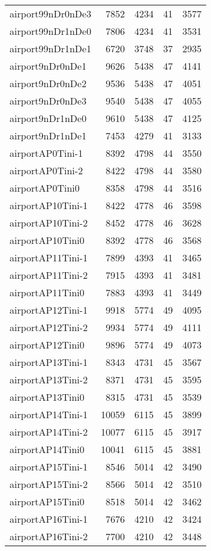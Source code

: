 \begin{longtable}{lrrrr}
airport99nDr0nDe3 & 7852 & 4234 & 41 & 3577 \\
airport99nDr1nDe0 & 7806 & 4234 & 41 & 3531 \\
airport99nDr1nDe1 & 6720 & 3748 & 37 & 2935 \\
airport9nDr0nDe1 & 9626 & 5438 & 47 & 4141 \\
airport9nDr0nDe2 & 9536 & 5438 & 47 & 4051 \\
airport9nDr0nDe3 & 9540 & 5438 & 47 & 4055 \\
airport9nDr1nDe0 & 9610 & 5438 & 47 & 4125 \\
airport9nDr1nDe1 & 7453 & 4279 & 41 & 3133 \\
airportAP0Tini-1 & 8392 & 4798 & 44 & 3550 \\
airportAP0Tini-2 & 8422 & 4798 & 44 & 3580 \\
airportAP0Tini0 & 8358 & 4798 & 44 & 3516 \\
airportAP10Tini-1 & 8422 & 4778 & 46 & 3598 \\
airportAP10Tini-2 & 8452 & 4778 & 46 & 3628 \\
airportAP10Tini0 & 8392 & 4778 & 46 & 3568 \\
airportAP11Tini-1 & 7899 & 4393 & 41 & 3465 \\
airportAP11Tini-2 & 7915 & 4393 & 41 & 3481 \\
airportAP11Tini0 & 7883 & 4393 & 41 & 3449 \\
airportAP12Tini-1 & 9918 & 5774 & 49 & 4095 \\
airportAP12Tini-2 & 9934 & 5774 & 49 & 4111 \\
airportAP12Tini0 & 9896 & 5774 & 49 & 4073 \\
airportAP13Tini-1 & 8343 & 4731 & 45 & 3567 \\
airportAP13Tini-2 & 8371 & 4731 & 45 & 3595 \\
airportAP13Tini0 & 8315 & 4731 & 45 & 3539 \\
airportAP14Tini-1 & 10059 & 6115 & 45 & 3899 \\
airportAP14Tini-2 & 10077 & 6115 & 45 & 3917 \\
airportAP14Tini0 & 10041 & 6115 & 45 & 3881 \\
airportAP15Tini-1 & 8546 & 5014 & 42 & 3490 \\
airportAP15Tini-2 & 8566 & 5014 & 42 & 3510 \\
airportAP15Tini0 & 8518 & 5014 & 42 & 3462 \\
airportAP16Tini-1 & 7676 & 4210 & 42 & 3424 \\
airportAP16Tini-2 & 7700 & 4210 & 42 & 3448 \\

\end{longtable}
